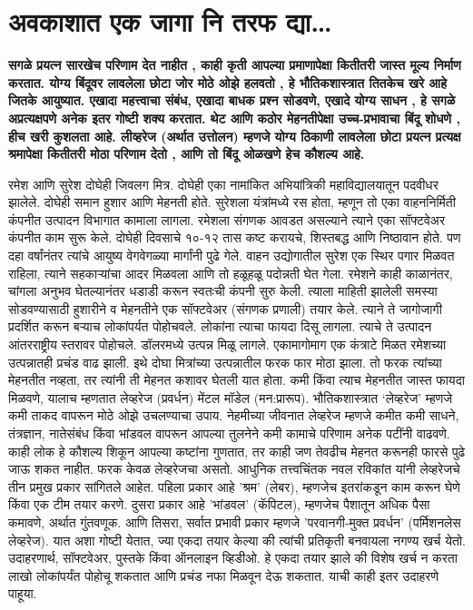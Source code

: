\chapter{अवकाशात एक जागा नि तरफ द्या…}

\textcolor{blue!60!black}{\textbf{सगळे प्रयत्न सारखेच परिणाम देत नाहीत , काही कृती आपल्या प्रमाणापेक्षा कितीतरी जास्त मूल्य निर्माण करतात. योग्य बिंदूवर लावलेला छोटा जोर मोठे ओझे हलवतो , हे भौतिकशास्त्रात तितकेच खरे आहे जितके आयुष्यात. एखादा महत्त्वाचा संबंध, एखादा बाधक प्रश्न सोडवणे, एखादे योग्य साधन , हे सगळे अप्रत्यक्षपणे अनेक इतर गोष्टी शक्य करतात. थेट आणि कठोर मेहनतीपेक्षा उच्च-प्रभावाचा बिंदू शोधणे , हीच खरी कुशलता आहे. लीव्हरेज (अर्थात उत्तोलन) म्हणजे योग्य ठिकाणी लावलेला छोटा प्रयत्न प्रत्यक्ष श्रमापेक्षा कितीतरी मोठा परिणाम देतो , आणि तो बिंदू ओळखणे हेच कौशल्य आहे.}}

रमेश आणि सुरेश दोघेही जिवलग मित्र. दोघेही एका नामांकित अभियांत्रिकी महाविद्यालयातून पदवीधर झालेले. दोघेही समान हुशार आणि मेहनती होते. सुरेशला यंत्रांमध्ये रस होता, म्हणून तो एका वाहननिर्मिती कंपनीत उत्पादन विभागात कामाला लागला. रमेशला संगणक आवडत असल्याने त्याने एका सॉफ्टवेअर कंपनीत काम सुरू केले. दोघेही दिवसाचे १०-१२ तास कष्ट करायचे, शिस्तबद्ध आणि निष्ठावान होते. पण दहा वर्षांनंतर त्यांचे आयुष्य वेगवेगळ्या मार्गांनी पुढे गेले.
वाहन उद्योगातील सुरेश एक स्थिर पगार मिळवत राहिला, त्याने सहकाऱ्यांचा आदर मिळवला आणि तो हळूहळू पदोन्नती घेत गेला. रमेशने काही काळानंतर, चांगला अनुभव घेतल्यानंतर धडाडी करून स्वतःची कंपनी सुरु केली. त्याला माहिती झालेली समस्या सोडवण्यासाठी हुशारीने व मेहनतीने एक सॉफ्टवेअर (संगणक प्रणाली) तयार केले. त्याने ते जागोजागी प्रदर्शित करून बऱ्याच लोकांपर्यत पोहोचवले. लोकांना त्याचा फायदा दिसू लागला. त्याचे ते उत्पादन आंतरराष्ट्रीय स्तरावर पोहोचले. डॉलरमध्ये उत्पन्न मिळू लागले. एकामागोमाग एक कंत्राटे मिळत रमेशच्या उत्पन्नातही प्रचंड वाढ झाली. इथे दोघा मित्रांच्या उत्पन्नातील फरक फार मोठा झाला. तो फरक त्यांच्या मेहनतीत नव्हता, तर त्यांनी ती मेहनत कशावर घेतली यात होता. कमी किंवा त्याच मेहनतीत जास्त फायदा मिळवणे, यालाच म्हणतात लेव्हरेज (प्रवर्धन) मेंटल मॉडेल (मन:प्रारूप). भौतिकशास्त्रात ‘लेव्हरेज’ म्हणजे कमी ताकद वापरून मोठे ओझे उचलण्याचा उपाय. नेहमीच्या जीवनात लेव्हरेज म्हणजे कमीत कमी साधने, तंत्रज्ञान, नातेसंबंध किंवा भांडवल वापरून आपल्या तुलनेने कमी कामाचे परिणाम अनेक पटींनी वाढवणे. काही लोक हे कौशल्य शिकून आपल्या कष्टांना गुणतात, तर काही जण तेवढीच मेहनत करूनही फारसे पुढे जाऊ शकत नाहीत. फरक केवळ लेव्हरेजचा असतो.
आधुनिक तत्त्वचिंतक नवल रविकांत यांनी लेव्हरेजचे तीन प्रमुख प्रकार सांगितले आहेत. पहिला प्रकार आहे 'श्रम' (लेबर), म्हणजेच इतरांकडून काम करून घेणे किंवा एक टीम तयार करणे. दुसरा प्रकार आहे 'भांडवल' (कॅपिटल), म्हणजेच पैशातून अधिक पैसा कमावणे, अर्थात गुंतवणूक. आणि तिसरा, सर्वात प्रभावी प्रकार म्हणजे 'परवानगी-मुक्त प्रवर्धन' (पर्मिशनलेस लेव्हरेज). यात अशा गोष्टी येतात, ज्या एकदा तयार केल्या की त्यांची प्रतिकृती बनवायला नगण्य खर्च येतो. उदाहरणार्थ, सॉफ्टवेअर, पुस्तके किंवा ऑनलाइन व्हिडीओ. हे एकदा तयार झाले की विशेष खर्च न करता लाखो लोकांपर्यंत पोहोचू शकतात आणि प्रचंड नफा मिळवून देऊ शकतात. याची काही इतर उदाहरणे पाहूया.
